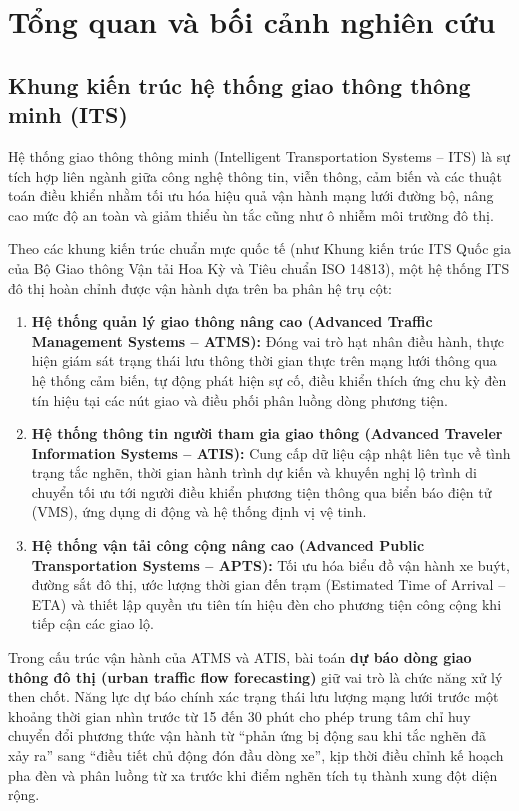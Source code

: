 \chapter{Tổng quan và bối cảnh nghiên cứu}
\label{chap:tong_quan}

\section{Khung kiến trúc hệ thống giao thông thông minh (ITS)}
Hệ thống giao thông thông minh (Intelligent Transportation Systems -- ITS) là sự tích hợp liên ngành giữa công nghệ thông tin, viễn thông, cảm biến và các thuật toán điều khiển nhằm tối ưu hóa hiệu quả vận hành mạng lưới đường bộ, nâng cao mức độ an toàn và giảm thiểu ùn tắc cũng như ô nhiễm môi trường đô thị.

Theo các khung kiến trúc chuẩn mực quốc tế (như Khung kiến trúc ITS Quốc gia của Bộ Giao thông Vận tải Hoa Kỳ và Tiêu chuẩn ISO 14813), một hệ thống ITS đô thị hoàn chỉnh được vận hành dựa trên ba phân hệ trụ cột:
\begin{enumerate}
    \item \textbf{Hệ thống quản lý giao thông nâng cao (Advanced Traffic Management Systems -- ATMS):} Đóng vai trò hạt nhân điều hành, thực hiện giám sát trạng thái lưu thông thời gian thực trên mạng lưới thông qua hệ thống cảm biến, tự động phát hiện sự cố, điều khiển thích ứng chu kỳ đèn tín hiệu tại các nút giao và điều phối phân luồng dòng phương tiện.
    \item \textbf{Hệ thống thông tin người tham gia giao thông (Advanced Traveler Information Systems -- ATIS):} Cung cấp dữ liệu cập nhật liên tục về tình trạng tắc nghẽn, thời gian hành trình dự kiến và khuyến nghị lộ trình di chuyển tối ưu tới người điều khiển phương tiện thông qua biển báo điện tử (VMS), ứng dụng di động và hệ thống định vị vệ tinh.
    \item \textbf{Hệ thống vận tải công cộng nâng cao (Advanced Public Transportation Systems -- APTS):} Tối ưu hóa biểu đồ vận hành xe buýt, đường sắt đô thị, ước lượng thời gian đến trạm (Estimated Time of Arrival -- ETA) và thiết lập quyền ưu tiên tín hiệu đèn cho phương tiện công cộng khi tiếp cận các giao lộ.
\end{enumerate}

Trong cấu trúc vận hành của ATMS và ATIS, bài toán \textbf{dự báo dòng giao thông đô thị (urban traffic flow forecasting)} giữ vai trò là chức năng xử lý then chốt. Năng lực dự báo chính xác trạng thái lưu lượng mạng lưới trước một khoảng thời gian nhìn trước từ 15 đến 30 phút cho phép trung tâm chỉ huy chuyển đổi phương thức vận hành từ ``phản ứng bị động sau khi tắc nghẽn đã xảy ra'' sang ``điều tiết chủ động đón đầu dòng xe'', kịp thời điều chỉnh kế hoạch pha đèn và phân luồng từ xa trước khi điểm nghẽn tích tụ thành xung đột diện rộng.

